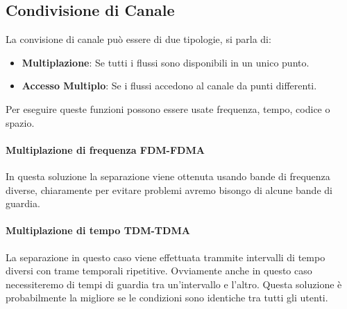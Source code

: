 \documentclass[12pt]{article}
\begin{document}
\subsection{Condivisione di Canale}
La convisione di canale può essere di due tipologie, si parla di:
\begin{itemize}
  \item \textbf{Multiplazione}: Se tutti i flussi sono disponibili in un unico punto.
  \item \textbf{Accesso Multiplo}: Se i flussi accedono al canale da punti differenti.
\end{itemize}

Per eseguire queste funzioni possono essere usate frequenza, tempo, codice o spazio.

\paragraph{Multiplazione di frequenza FDM-FDMA}
In questa soluzione la separazione viene ottenuta usando bande di frequenza diverse, chiaramente per evitare problemi avremo bisongo di alcune bande di guardia.

\paragraph{Multiplazione di tempo TDM-TDMA}
La separazione in questo caso viene effettuata trammite intervalli di tempo diversi con trame temporali ripetitive. Ovviamente anche in questo caso necessiteremo di tempi di guardia tra un'intervallo e l'altro. Questa soluzione è probabilmente la migliore se le condizioni sono identiche tra tutti gli utenti.
\end{document}
